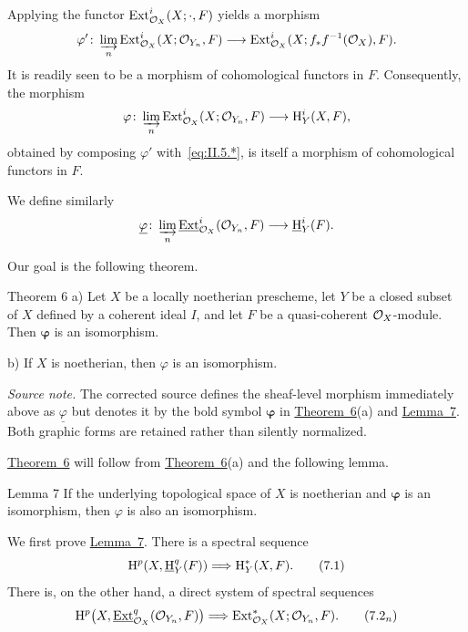 Applying the functor $\operatorname{Ext}_{\mathcal O_X}^i(X;\mathord\cdot,F)$ yields a morphism
\[
  \varphi'\colon
  \varinjlim_n\operatorname{Ext}_{\mathcal O_X}^i(X;\mathcal O_{Y_n},F)
  \longrightarrow
  \operatorname{Ext}_{\mathcal O_X}^i(X;f_*f^{-1}(\mathcal O_X),F).
\]
It is readily seen to be a morphism of cohomological functors in $F$.
Consequently, the morphism
\[
  \varphi\colon
  \varinjlim_n\operatorname{Ext}_{\mathcal O_X}^i(X;\mathcal O_{Y_n},F)
  \longrightarrow \mathrm H_Y^i(X,F),
\]
obtained by composing $\varphi'$ with~\eqref{eq:II.5.*}, is itself a
morphism of cohomological functors in $F$.

We define similarly
\[
  \underline{\varphi}\colon
  \varinjlim_n\mathop{\underline{\mathrm{Ext}}}\nolimits_{\mathcal O_X}^i(\mathcal O_{Y_n},F)
  \longrightarrow \mathop{\underline{\mathrm H}}\nolimits_Y^i(F).
\]

Our goal is the following theorem.

\begin{sgastatement}{Theorem 6}
\textup{a)} Let $X$ be a locally noetherian prescheme, let $Y$ be a closed
subset of $X$ defined by a coherent ideal $I$, and let $F$ be a
quasi-coherent $\mathcal O_X$-module. Then $\boldsymbol{\varphi}$ is an isomorphism.

\textup{b)} If $X$ is noetherian, then $\varphi$ is an isomorphism.
\end{sgastatement}

\noindent\textit{Source note.} The corrected source defines the sheaf-level
morphism immediately above as $\underline{\varphi}$ but denotes it by the
bold symbol $\boldsymbol{\varphi}$ in \hyperref[II.6]{Theorem~6}(a) and \hyperref[II.7]{Lemma~7}. Both graphic
forms are retained rather than silently normalized.

\hyperref[II.6]{Theorem~6} will follow from \hyperref[II.6]{Theorem~6}(a) and the following lemma.

\begin{sgastatement}{Lemma 7}
If the underlying topological space of $X$ is noetherian and
$\boldsymbol{\varphi}$ is an isomorphism, then $\varphi$ is also an
isomorphism.
\end{sgastatement}

We first prove \hyperref[II.7]{Lemma~7}. There is a spectral sequence
\begin{equation}
  \mathrm H^p(X,\mathop{\underline{\mathrm H}}\nolimits_Y^q(F))
  \Longrightarrow \mathrm H_Y^*(X,F).
  \tag{7.1}\label{eq:II.7.1}
\end{equation}
There is, on the other hand, a direct system of spectral sequences
\begin{equation}
  \mathrm H^p\bigl(X,\mathop{\underline{\mathrm{Ext}}}\nolimits_{\mathcal O_X}^q(\mathcal O_{Y_n},F)\bigr)
  \Longrightarrow \operatorname{Ext}_{\mathcal O_X}^*(X;\mathcal O_{Y_n},F).
  \tag{7.2$_n$}\label{eq:II.7.2n}
\end{equation}

